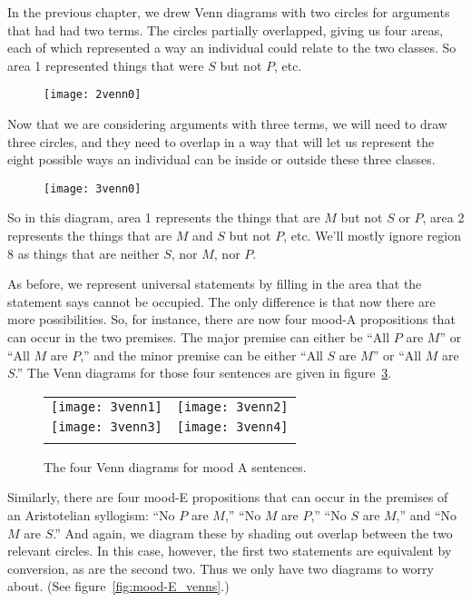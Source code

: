 In the previous chapter, we drew Venn diagrams with two circles for arguments that had had two terms. The circles partially overlapped, giving us four areas, each of which represented a way an individual could relate to the two classes. So area 1 represented things that were $S$ but not $P$, etc.

\begin{figure}[!ht]\centering
\texttt{[image: 2venn0]}
\label{fig:2vennlabels}
\end{figure}

Now that we are considering arguments with three terms, we will need to draw three circles, and they need to overlap in a way that will let us represent the eight possible ways an individual can be inside or outside these three classes.

\begin{figure}[!ht]\centering
\texttt{[image: 3venn0]}
\label{fig:3vennlabels}
\end{figure}

So in this diagram, area 1 represents the things that are $M$ but not $S$ or $P$, area 2 represents the things that are $M$ and $S$ but not $P$, etc. We'll mostly ignore region 8 as things that are neither $S$, nor $M$, nor $P$.

As before, we represent universal statements by filling in the area that the statement says cannot be occupied. The only difference is that now there are more possibilities. So, for instance, there are now four mood-A propositions that can occur in the two premises. The major premise can either be ``All $P$ are $M$'' or ``All $M$ are $P$,'' and the minor premise can be either ``All $S$ are $M$'' or ``All $M$ are $S$.'' The Venn diagrams for those four sentences are given in figure~\ref{fig:mood-A_venns}.

\begin{figure}
\begin{tabu}{X[1,c] X[1,c]}
\texttt{[image: 3venn1]} &
\texttt{[image: 3venn2]} \\
\texttt{[image: 3venn3]} &
\texttt{[image: 3venn4]} \\
\caption{The four Venn diagrams for mood A sentences.}
\label{fig:mood-A_venns}
\end{tabu}
\end{figure}

Similarly, there are four mood-E propositions that can occur in the premises of an Aristotelian syllogism: ``No $P$ are $M$,'' ``No $M$ are $P$,'' ``No $S$ are $M$,'' and ``No $M$ are $S$.'' And again, we diagram these by shading out overlap between the two relevant circles. In this case, however, the first two statements are equivalent by conversion, as are the second two. Thus we only have two diagrams to worry about. (See figure~\ref{fig:mood-E_venns}.)

